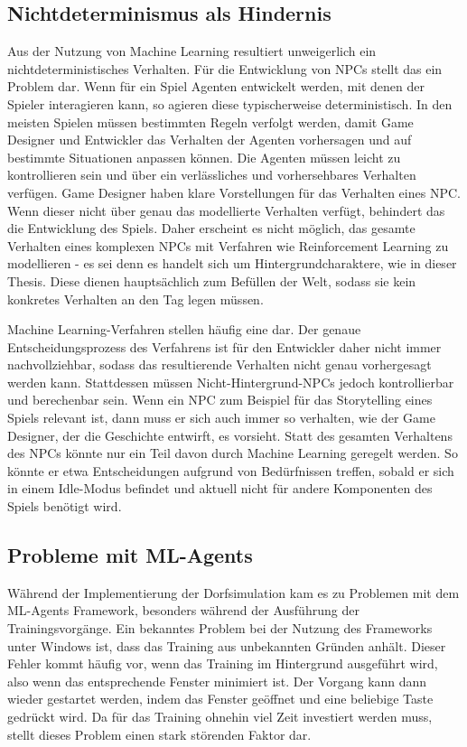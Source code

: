 \subsection{Nichtdeterminismus als Hindernis}
Aus der Nutzung von Machine Learning resultiert unweigerlich ein nichtdeterministisches Verhalten. Für die Entwicklung von NPCs stellt das ein Problem dar. Wenn für ein Spiel Agenten entwickelt werden, mit denen der Spieler interagieren kann, so agieren diese typischerweise deterministisch. In den meisten Spielen müssen bestimmten Regeln verfolgt werden, damit Game Designer und Entwickler das Verhalten der Agenten vorhersagen und auf bestimmte Situationen anpassen können. Die Agenten müssen leicht zu kontrollieren sein und über ein verlässliches und vorhersehbares Verhalten verfügen. Game Designer haben klare Vorstellungen für das Verhalten eines NPC. Wenn dieser nicht über genau das modellierte Verhalten verfügt, behindert das die Entwicklung des Spiels.
Daher erscheint es nicht möglich, das gesamte Verhalten eines komplexen NPCs mit Verfahren wie Reinforcement Learning zu modellieren - es sei denn es handelt sich um Hintergrundcharaktere, wie in dieser Thesis. Diese dienen hauptsächlich zum Befüllen der Welt, sodass sie kein konkretes Verhalten an den Tag legen müssen. 

Machine Learning-Verfahren stellen häufig eine  dar. Der genaue Entscheidungsprozess des Verfahrens ist für den Entwickler daher nicht immer nachvollziehbar, sodass das resultierende Verhalten nicht genau vorhergesagt werden kann. Stattdessen müssen Nicht-Hintergrund-NPCs jedoch kontrollierbar und berechenbar sein. Wenn ein NPC zum Beispiel für das Storytelling eines Spiels relevant ist, dann muss er sich auch immer so verhalten, wie der Game Designer, der die Geschichte entwirft, es vorsieht. Statt des gesamten Verhaltens des NPCs könnte nur ein Teil davon durch Machine Learning geregelt werden. So könnte er etwa Entscheidungen aufgrund von Bedürfnissen treffen, sobald er sich in einem Idle-Modus befindet und aktuell nicht für andere Komponenten des Spiels benötigt wird.





\subsection{Probleme mit ML-Agents}
Während der Implementierung der Dorfsimulation kam es zu Problemen mit dem ML-Agents Framework, besonders während der Ausführung der Trainingsvorgänge. Ein bekanntes Problem bei der Nutzung des Frameworks unter Windows ist, dass das Training aus unbekannten Gründen anhält. Dieser Fehler kommt häufig vor, wenn das Training im Hintergrund ausgeführt wird, also wenn das entsprechende Fenster minimiert ist. Der Vorgang kann dann wieder gestartet werden, indem das Fenster geöffnet und eine beliebige Taste gedrückt wird.
Da für das Training ohnehin viel Zeit investiert werden muss, stellt dieses Problem einen stark störenden Faktor dar.

